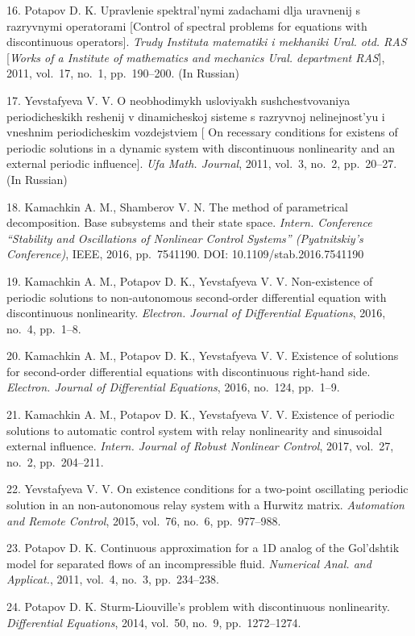 {16. Potapov D. K. Upravlenie spektral'nymi zadachami dlja
uravnenij s razryvnymi operatorami [Control of spectral problems
for equations with discontinuous operators]. {\it Trudy Instituta
matematiki i mekhaniki Ural. otd. RAS}  [{\it  Works of a
Institute of mathematics and mechanics Ural. department RAS}],
2011, vol.~17, no.~1, pp.~190--200. (In Russian)

17. Yevstafyeva V. V. O neobhodimykh usloviyakh sushchestvovaniya
periodicheskikh reshenij v dinamicheskoj sisteme s razryvnoj
nelinejnost'yu i vneshnim periodicheskim vozdejstviem [ On
recessary conditions for existens of periodic solutions in a
dynamic system with discontinuous nonlinearity and an external
periodic influence]. {\it Ufa Math. Journal}, 2011, vol.~3, no.~2,
pp.~20--27. (In Russian)

18. Kamachkin A. M., Shamberov V. N. The method of parametrical
decomposition. Base subsystems and their state space. {\it Intern.
Conference ``Stability and Oscillations of Nonlinear Control
Systems'' (Pyatnitskiy's Conference)}, IEEE, 2016, pp.~7541190.
DOI: 10.1109/stab.2016.7541190

19. Kamachkin A. M., Potapov D. K., Yevstafyeva V. V.
Non-existence of periodic solutions to non-autonomous second-order
differential equation with discontinuous nonlinearity. {\it
Electron. Journal of Differential Equations}, 2016, no.~4,
pp.~1--8.

20. Kamachkin A. M., Potapov D. K., Yevstafyeva V. V. Existence of
solutions for second-order differential equations with
discontinuous right-hand side. {\it Electron. Journal of
Differential Equations}, 2016, no.~124, pp.~1--9.

21. Kamachkin A. M., Potapov D. K., Yevstafyeva V. V. Existence of
periodic solutions to automatic control system with relay
nonlinearity and sinusoidal external influence. {\it Intern.
Journal of Robust Nonlinear Control}, 2017, vol.~27, no.~2,
pp.~204--211.

22. Yevstafyeva V. V. On existence conditions for a two-point
oscillating periodic solution in an non-autonomous relay system
with a Hurwitz matrix. {\it Automation and Remote Control}, 2015,
vol.~76, no.~6, pp.~977--988.

23. Potapov D. K. Continuous approximation for a 1D analog of the
Gol'dshtik model for separated flows of an incompressible fluid.
{\it Numerical Anal. and Applicat.}, 2011, vol.~4, no.~3,
pp.~234--238.

24. Potapov D. K. Sturm-Liouville's problem with discontinuous
nonlinearity. {\it Differential Equations}, 2014, vol.~50, no.~9,
pp.~1272--1274.

}
